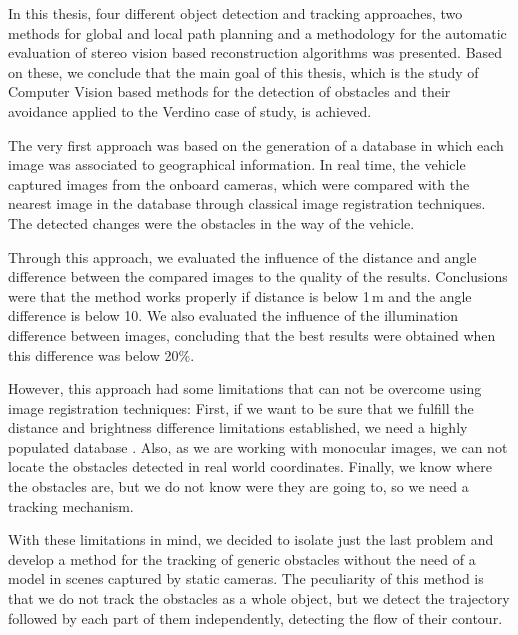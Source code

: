 

In this thesis, four different object detection and tracking approaches, two methods for global and local path planning and a methodology for the automatic evaluation of stereo vision based reconstruction algorithms was presented. Based on these, we conclude that the main goal of this thesis, which is the study of Computer Vision based methods for the detection of obstacles and their avoidance applied to the Verdino case of study, is achieved.

The very first approach was based on the generation of a database in which each image was associated to geographical information. In real time, the vehicle captured images from the onboard cameras, which were compared with the nearest image in the database through classical image registration techniques. The detected changes were the obstacles in the way of the vehicle. 

Through this approach, we evaluated the influence of the distance and angle difference between the compared images to the quality of the results. Conclusions were that the method works properly if distance is below 1\,m and the angle difference is below 10\textdegree. We also evaluated the influence of the illumination difference between images, concluding that the best results were obtained when this difference was below 20\%.

However, this approach had some limitations that can not be overcome using image registration techniques: First, if we want to be sure that we fulfill the distance and brightness difference limitations established, we need a highly populated database . Also, as we are working with monocular images, we can not locate the obstacles detected in real world coordinates. Finally, we know where the obstacles are, but we do not know were they are going to, so we need a tracking mechanism.

With these limitations in mind, we decided to isolate just the last problem and develop a method for the tracking of generic obstacles without the need of a model in scenes captured by static cameras. The peculiarity of this method is that we do not track the obstacles as a whole object, but we detect the trajectory followed by each part of them independently, detecting the flow of their contour.


